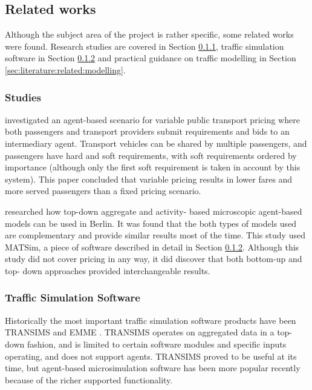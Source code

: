 \subsection{Related works}
\label{sec:literature:related}

Although the subject area of the project is rather specific, some related works
were found. Research studies are covered in Section
\ref{sec:literature:related:studies}, traffic simulation software in Section
\ref{sec:literature:related:simulation} and practical guidance on traffic
modelling in Section \ref{sec:literature:related:modelling}.

\subsubsection{Studies}
\label{sec:literature:related:studies}

\textcite{Emele2013pricing+rural} investigated an agent-based scenario for
variable public transport pricing where both passengers and transport providers
submit requirements and bids to an intermediary agent. Transport vehicles can
be shared by multiple passengers, and passengers have hard and soft
requirements, with soft requirements ordered by importance (although only the
first soft requirement is taken in account by this system). This paper
concluded that variable pricing results in lower fares and more served
passengers than a fixed pricing scenario.

\textcite{Neumann2011berlin} researched how top-down aggregate and activity-
based microscopic agent-based models can be used in Berlin. It was found that
the both types of models used are complementary and provide similar results
most of the time. This study used MATSim, a piece of software described in
detail in Section \ref{sec:literature:related:simulation}. Although this study
did not cover pricing in any way, it did discover that both bottom-up and top-
down approaches provided interchangeable results.


\subsubsection{Traffic Simulation Software}
\label{sec:literature:related:simulation}

Historically the most important traffic simulation software products have been
TRANSIMS \parencite{Smith1995taxi+transims} and EMME
\parencite{Gao2010taxi+comparison}. TRANSIMS operates on aggregated data in a
top-down fashion, and is limited to certain software modules and specific
inputs operating, and does not support agents. TRANSIMS proved to be useful at
its time, but agent-based microsimulation software has been more popular
recently because of the richer supported functionality.
\parencite{Bernhardt2007taxi+agent}


